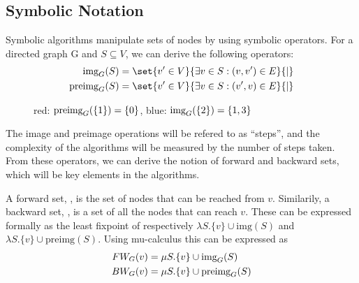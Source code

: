 \documentclass[../master/master.tex]{subfiles}
\begin{document}
\subsection{Symbolic Notation}
Symbolic algorithms manipulate sets of nodes by using symbolic operators. For a directed graph G and $S\subseteq V$, we can derive the following operators: 
\begin{align*}
\img S &= \set{v' \in V}{\exists v\in S:(v, v')\in E}{|}\\
\pre S &= \set{v' \in V}{\exists v\in S:(v', v)\in E}{|}
\end{align*}

\begin{figure}[H]
\center
{}
\caption{red: $\text{preimg}_{G}(\{1\}) = \{0\}$, blue: $\text{img}_{G}(\{2\}) = \{1,3\}$ }
\label{imgpreimg}
\end{figure}

The image and preimage operations will be refered to as ``steps'', and the complexity of the algorithms will be measured by the number of steps taken. From these operators, we can derive the notion of forward and backward sets, which will be key elements in the algorithms.

A forward set, , is the set of nodes that can be reached from $v$. Similarily, a backward set, , is a set of all the nodes that can reach $v$. These can be expressed formally as the least fixpoint of respectively $\lambda S.\{v\}\cup \text{img}(S)$ and $\lambda S.\{v\}\cup \text{preimg}(S)$. Using mu-calculus \cite{clarke_peled_grumberg_1999} this can be expressed as 
\begin{align}\label{fw}
FW_{G}(v) &= \mu S.\{v\}\cup \text{img}_G(S)\\
\label{bw}BW_{G}(v) &= \mu S.\{v\}\cup \text{preimg}_G(S)
\end{align}
\end{document}
